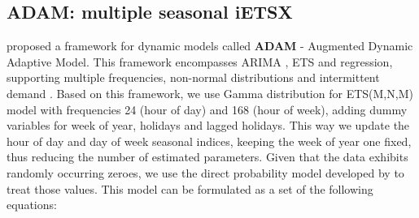 \documentclass[]{elsarticle} %
\begin{document}
\hypertarget{adam-multiple-seasonal-ietsx}{%
\subsection{ADAM: multiple seasonal iETSX}\label{adam-multiple-seasonal-ietsx}}

\citet{SvetunkovAdam2021} proposed a framework for dynamic models called \textbf{ADAM} - Augmented Dynamic Adaptive Model. This framework encompasses ARIMA \citep{Box1976}, ETS \citep{Hyndman2008b} and regression, supporting multiple frequencies, non-normal distributions and intermittent demand \citep{Svetunkov2019a}. Based on this framework, we use Gamma distribution for ETS(M,N,M) model with frequencies 24 (hour of day) and 168 (hour of week), adding dummy variables for week of year, holidays and lagged holidays. This way we update the hour of day and day of week seasonal indices, keeping the week of year one fixed, thus reducing the number of estimated parameters. Given that the data exhibits randomly occurring zeroes, we use the direct probability model developed by \citet{Svetunkov2019a} to treat those values. This model can be formulated as a set of the following equations:
\end{document}
